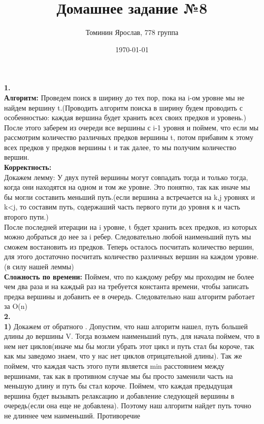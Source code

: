 \documentclass[a4paper,12pt]{article}
\author{Томинин Ярослав, 778 группа}
\title{Домашнее задание №8}
\date{\today}
\begin{document}
 

\maketitle
\newpage
\textbf{1.}\\
\textbf{Алгоритм:} Проведем поиск в ширину до тех пор, пока на i-ом уровне мы не найдем вершину t.(Проводить алгоритм поиска в ширину будем проводить с особенностью: каждая вершина будет хранить всех своих предков и уровень.) После этого заберем из очереди все вершины с i-1  уровня и поймем, что если мы рассмотрим количество различных предков вершины t, потом прибавим к этому всех предков у предков вершины t и так далее, то мы получим количество вершин.\\
\textbf{Корректность:} \\
Докажем лемму: У двух путей вершины могут совпадать тогда и только тогда, когда они находятся на одном и том же уровне. Это понятно, так как иначе мы бы могли составить меньший путь.(если вершина а встречается на k,j уровнях и k<j, то составим путь, содержаший часть первого пути до уровня к и часть второго пути.)\\
После последней итерации на i уровне, t будет хранить всех предков, из которых можно добраться до нее за i ребер. Следовательно любой наименьший путь мы сможем востановить из предков. Теперь осталось посчитать количество вершин, для этого достаточно посчитать количество различных вершин на каждом уровне.(в силу нашей леммы)\\
\textbf{Сложность по времени:} Поймем, что по каждому ребру мы проходим не более чем два раза и на каждый раз на требуется константа времени, чтобы записать предка вершины и добавить ее в очередь. Следовательно наш алгоритм работает за O(n)\\
\textbf{2.}\\
\textbf{1)} Докажем от обратного . Допустим, что наш алгоритм нашел, путь большей длины до вершины V. Тогда возьмем наименьший путь, для начала поймем, что в нем нет циклов(иначе мы бы могли убрать этот цикл и путь стал бы короче, так как мы заведомо знаем, что у нас нет циклов отрицательной длины). Так же поймем, что каждая часть этого пути является min  расстоянием между вершинами, так как в противном случае мы бы просто заменили часть на меньшую длину и путь бы стал короче. Поймем, что каждая предыдущая вершина будет вызывать релаксацию и добавление следующей вершины в очередь(если она еще не добавлена). Поэтому наш алгоритм найдет путь точно не длиннее чем наименьший. Противоречие \\
\end{document}
